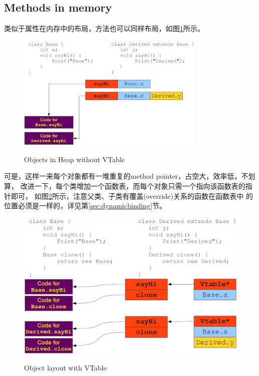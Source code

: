 \subsection[Methods in memory]{Methods in memory}
类似于属性在内存中的布局，方法也可以同样布局，如图\ref{fig:novtable}所示。
\begin{figure}
  \centering
  \includegraphics[width=0.8\textwidth]{picturedir/functions-without-vtable.jpg}\\
  \caption{Objects in Heap without VTable}\label{fig:novtable}
\end{figure}
可是，这样一来每个对象都有一堆重复的method pointer，占空大，效率低，不划算，
改进一下，每个类增加一个函数表，而每个对象只需一个指向该函数表的指针即可，
如图\ref{fig:vtable}所示，注意父类、子类有覆盖(override)关系的函数在函数表中
的位置必须是一样的，详见第\ref{sec:dynamicbinding}节。
\begin{figure}
  \centering
  \includegraphics[width=.8\textwidth]{picturedir/objects-in-memory-optimization.jpg}\\
  \caption{Object layout with VTable}\label{fig:vtable}
\end{figure}
